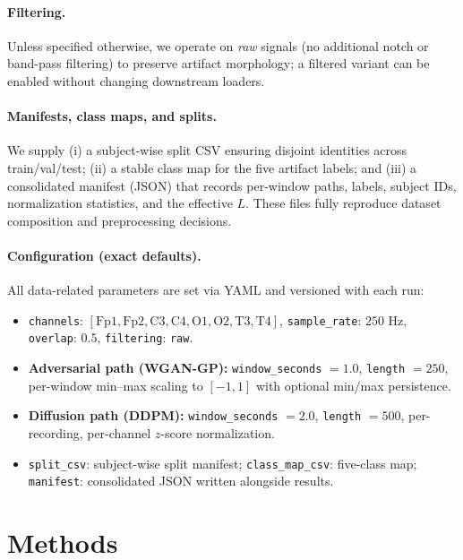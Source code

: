 \documentclass{article}
\begin{document}
\paragraph{Filtering.}
Unless specified otherwise, we operate on \emph{raw} signals (no additional notch or band-pass filtering) to preserve artifact morphology; a filtered variant can be enabled without changing downstream loaders.

\paragraph{Manifests, class maps, and splits.}
We supply (i) a subject-wise split CSV ensuring disjoint identities across train/val/test; (ii) a stable class map for the five artifact labels; and (iii) a consolidated manifest (JSON) that records per-window paths, labels, subject IDs, normalization statistics, and the effective \(L\). These files fully reproduce dataset composition and preprocessing decisions.

\paragraph{Configuration (exact defaults).}
All data-related parameters are set via YAML and versioned with each run:
\begin{itemize}
\item \texttt{channels}: \([ \text{Fp1}, \text{Fp2}, \text{C3}, \text{C4}, \text{O1}, \text{O2}, \text{T3}, \text{T4} ]\), \quad \texttt{sample\_rate}: \(250\) Hz, \quad \texttt{overlap}: \(0.5\), \quad \texttt{filtering}: \texttt{raw}.
\item \textbf{Adversarial path (WGAN-GP):} \texttt{window\_seconds} \(= 1.0\), \texttt{length} \(= 250\), per-window min--max scaling to \([-1,1]\) with optional min/max persistence.
\item \textbf{Diffusion path (DDPM):} \texttt{window\_seconds} \(= 2.0\), \texttt{length} \(= 500\), per-recording, per-channel \(z\)-score normalization.
\item \texttt{split\_csv}: subject-wise split manifest; \texttt{class\_map\_csv}: five-class map; \texttt{manifest}: consolidated JSON written alongside results.
\end{itemize}



\section{Methods}
\end{document}
